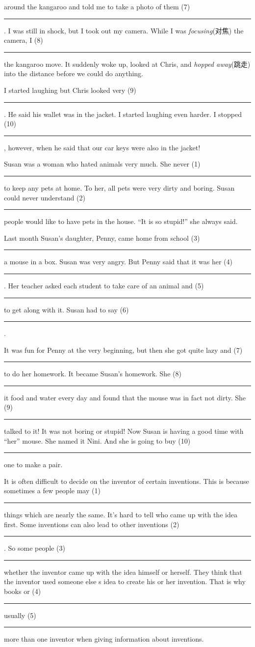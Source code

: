 \documentclass{article}
\newcommand{\kong}{\rule{4em}{0.5pt} }
\begin{document}
around the kangaroo and told me to take a photo of them 
(7)\kong . I was still in shock, but I took out my 
camera. While I was \textit{focusing}\/(对焦) the camera, I 
(8)\kong the kangaroo move. It suddenly woke up, 
looked at Chris, and \textit{hopped away}\/(跳走) into the distance before we could do anything.

I started laughing but Chris looked very (9)\kong . He 
said his wallet was in the jacket. I started laughing even harder. I stopped 
(10)\kong , however, when he said that our car keys were also in 
the jacket!

\begin{center}
\end{center}

Susan was a woman who hated animals very much. She never (1)\kong to keep any pets at home. To her, all pets were very dirty and boring. Susan could never understand (2)\kong people would like to have pets in the house. “It is so stupid!” she always said.

Last month Susan's daughter, Penny, came home from school (3)\kong a mouse in a box. Susan was very angry. But Penny said that it was her (4)\kong. Her teacher asked each student to take care of an animal and (5)\kong to get along with it. Susan had to say (6)\kong .

It was fun for Penny at the very beginning, but then she got quite lazy and (7)\kong to do her homework. It became Susan’s homework. She (8)\kong it food and water every day and found that the mouse was in fact not dirty. She (9)\kong talked to it! It was not boring or stupid! Now Susan is having a good time with “her” mouse. She named it Nini. And she is going to buy (10)\kong one to make a pair.

\begin{center}
\end{center}

It is often difficult to decide on the inventor of certain inventions. This is because sometimes a few people may (1)\kong things which are nearly the same. It’s hard to tell who came up with the
idea first. Some inventions can also lead to other inventions (2)\kong. So some people (3)\kong whether the inventor came up with the idea himself or herself. They think that the inventor used someone else s idea to create his or her invention. That is why books or (4)\kong usually (5) \kong more than one inventor when giving information about inventions.
\end{document}
